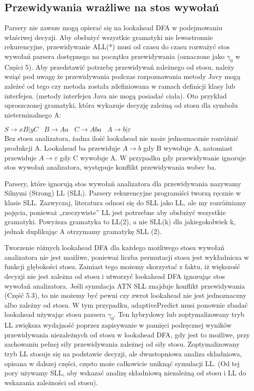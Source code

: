 \subsection{Przewidywania wrażliwe na stos wywołań}
Parsery nie zawsze mogą opierać się na lookahead DFA w podejmowaniu właściwej decyzji.
Aby obsłużyć wszystkie gramatyki nie lewostronnie rekurencyjne,
przewidywanie ALL(*) musi od czasu do czasu rozważyć stos wywołań parsera
dostępnego na początku przewidywania (oznaczone jako $\gamma_0$ w Części 5).
Aby przedstawić potrzebę przewidywań zależnego od stosu, należy wziąć pod uwagę
że przewidywania podczas rozpoznawania metody Javy mogą zależeć od tego
czy metoda została zdefiniowana w ramach definicji klasy lub interfejsu.
(metody interfejsu Java nie mogą posiadać ciała).
Oto przykład uproszczonej gramatyki, która wykazuje decyzję zależną od stosu dla symbolu nieterminalnego A:
\par
\( S \rightarrow xB|yC  \;\;\; B \rightarrow Aa \;\;\; C \rightarrow Aba \;\;\; A \rightarrow b|\varepsilon\)
\\
Bez stosu analizatora, żadna ilość lookahead nie może jednoznacznie rozróżnić
produkcji A. Lookahead ba przewiduje \(A \rightarrow b\) gdy B wywołuje A,
natomiast przewiduje \(A \rightarrow \varepsilon \) gdy C wywołuje A.
W przypadku gdy przewidywanie ignoruje stos wywołań analizatora,
występuje konflikt przewidywania wobec ba.
\par
Parsery, które ignorują stos wywołań analizatora dla przewidywania nazywamy
Silnymi (Strong) LL (SLL). Parsery rekurencyjne programiści tworzą ręcznie
w klasie SLL. Zazwyczaj, literatura odnosi się do SLL jako LL,
ale my rozróżniamy pojęcia, ponieważ „rzeczywiste” LL jest potrzebne aby
obsłużyć wszystkie gramatyki. Powyższa gramatyka to LL(2), a nie SLL(k) dla
jakiegokolwiek k, jednak duplikując A otrzymamy gramatykę SLL (2).
\par
Tworzenie różnych lookahead DFA dla każdego możliwego stosu wywołań
analizatora nie jest możliwe, ponieważ liczba permutacji stosu jest
wykładnicza w funkcji głębokości stosu.
Zamiast tego możemy skorzystać z faktu, iż większość decyzji nie jest zależna
od stosu i utworzyć lookahead DFA ignorując stos wywołań analizatora.
Jeśli symulacja ATN SLL znajduje konflikt przewidywania (Część 5.3),
to nie możemy być pewni czy zwrot lookahead nie jest jednoznaczny
albo zależny od stosu. 
W tym przypadku, adaptivePredict musi ponownie zbadać lookahead używając stosu parsera $\gamma_0$.
Ten hybrydowy lub zoptymalizowany tryb LL zwiększa wydajność poprzez zapisywanie
w pamięci podręcznej wyników przewidywania niezależnych od stosu w lookahead DFA,
gdy jest to możliwe, przy zachowaniu pełnej siły przewidywania zależnej od siły stosu.
Zoptymalizowany tryb LL stosuje się na podstawie decyzji,
ale dwustopniowa analiza składniowa, opisana w dalszej części,
często może całkowicie uniknąć symulacji LL.
(Od tej pory używamy SLL, aby wskazać analizę składniową niezależną od stosu
i LL do wskazania zależności od stosu).

